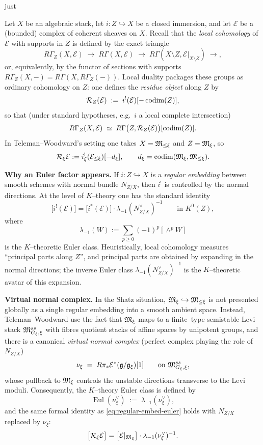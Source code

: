 just \documentclass[12pt]{article}
\DeclareMathOperator{\Eul}{Eul}
\begin{document}
\begin{remark}
Let $X$ be an algebraic stack, let $i:Z\hookrightarrow X$ be a closed immersion,
and let $\mathcal E$ be a (bounded) complex of coherent sheaves on $X$.
Recall that the \emph{local cohomology} of $\mathcal E$ with supports in $Z$ is
defined by the exact triangle
\[
R\Gamma_Z(X,\mathcal E)\;\longrightarrow\;R\Gamma(X,\mathcal E)
\;\longrightarrow\;R\Gamma(X\setminus Z,\mathcal E|_{X\setminus Z})\;\longrightarrow,
\]
or, equivalently, by the functor of sections with supports
$R\Gamma_Z(X,-)=R\Gamma(X,R\Gamma_Z(-))$.
Local duality packages these groups as ordinary cohomology on $Z$:
one defines the \emph{residue object} along $Z$ by
\[
\mathcal R_Z(\mathcal E)\;:=\; i^!(\mathcal E)[-\operatorname{codim}(Z)],
\]
so that (under standard hypotheses, e.g.\ $i$ a local complete intersection)
\[
R\Gamma_Z(X,\mathcal E)\;\simeq\;R\Gamma\bigl(Z,\mathcal R_Z(\mathcal E)\bigr)[\operatorname{codim}(Z)].
\]
In Teleman--Woodward's setting one takes $X=\mathfrak{M}_{\le\xi}$ and $Z=\mathfrak{M}_\xi$, so
\[
\mathcal R_\xi\mathcal E := i_\xi^!(\mathcal E_{\le\xi})[-d_\xi],
\qquad d_\xi=\operatorname{codim}(\mathfrak{M}_\xi,\mathfrak{M}_{\le\xi}).
\]

\smallskip
\noindent\textbf{Why an Euler factor appears.}
If $i:Z\hookrightarrow X$ is a \emph{regular embedding} between smooth schemes
with normal bundle $N_{Z/X}$, then $i^!$ is controlled by the normal directions.
At the level of $K$--theory one has the standard identity
\begin{equation}
\label{eq:regular-embed-euler}
\bigl[i^!(\mathcal E)\bigr]
=
\bigl[i^*(\mathcal E)\bigr]\cdot \lambda_{-1}(N_{Z/X}^\vee)^{-1}
\qquad\text{in }K^0(Z),
\end{equation}
where
\[
\lambda_{-1}(W):=\sum_{p\ge 0}(-1)^p[\wedge^p W]
\]
is the $K$--theoretic Euler class.
Heuristically, local cohomology measures ``principal parts along $Z$'',
and principal parts are obtained by expanding in the normal directions; the
inverse Euler class $\lambda_{-1}(N_{Z/X}^\vee)^{-1}$ is the $K$--theoretic avatar
of this expansion.

\smallskip
\noindent\textbf{Virtual normal complex.}
In the Shatz situation, $\mathfrak{M}_\xi\hookrightarrow \mathfrak{M}_{\le\xi}$ is not presented
globally as a single regular embedding into a smooth ambient space.  Instead,
Teleman--Woodward use the fact that $\mathfrak{M}_\xi$ maps to a finite--type semistable
Levi stack $\mathfrak{M}^{ss}_{G_\xi,\xi}$ with fibres quotient stacks of affine spaces
by unipotent groups, and there is a canonical \emph{virtual normal complex}
(perfect complex playing the role of $N_{Z/X}$)
\[
\nu_\xi \;=\; R\pi_*\mathcal E^*(\mathfrak{g}/\mathfrak{g}_\xi)[1]
\qquad\text{on }\mathfrak{M}^{ss}_{G_\xi,\xi},
\]
whose pullback to $\mathfrak{M}_\xi$ controls the unstable directions transverse to the
Levi moduli.  Consequently, the $K$--theory Euler class is defined by
\[
\Eul(\nu_\xi^\vee)\;:=\;\lambda_{-1}(\nu_\xi^\vee),
\]
and the same formal identity as \eqref{eq:regular-embed-euler} holds with
$N_{Z/X}$ replaced by $\nu_\xi$:
\begin{equation}
\label{eq:virtual-euler}
\bigl[\mathcal R_\xi\mathcal E\bigr]
=
\bigl[\mathcal E|_{\mathfrak{M}_\xi}\bigr]\cdot \lambda_{-1}(\nu_\xi^\vee)^{-1}.
\end{equation}
\end{remark}
\end{document}
